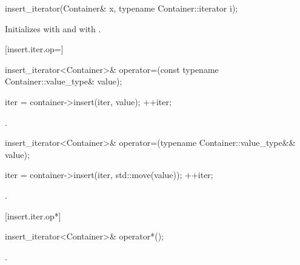 %

\begin{itemdecl}
insert_iterator(Container& x, typename Container::iterator i);
\end{itemdecl}

\begin{itemdescr}
\pnum
\effects
Initializes
with  and
with .
\end{itemdescr}

[insert.iter.op=]{}

%
\begin{itemdecl}
insert_iterator<Container>&
  operator=(const typename Container::value_type& value);
\end{itemdecl}

\begin{itemdescr}
\pnum
\effects
\begin{codeblock}
iter = container->insert(iter, value);
++iter;
\end{codeblock}

\pnum
\returns
{}.
\end{itemdescr}

%
\begin{itemdecl}
insert_iterator<Container>&
  operator=(typename Container::value_type&& value);
\end{itemdecl}

\begin{itemdescr}
\pnum
\effects
\begin{codeblock}
iter = container->insert(iter, std::move(value));
++iter;
\end{codeblock}

\pnum
\returns
{}.
\end{itemdescr}

[insert.iter.op*]{}

%
\begin{itemdecl}
insert_iterator<Container>& operator*();
\end{itemdecl}

\begin{itemdescr}
\pnum
\returns
{}.
\end{itemdescr}


